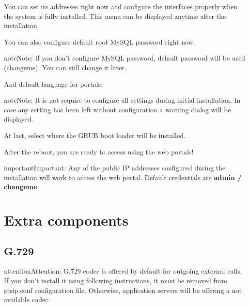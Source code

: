 \documentclass[letterpaper,10pt,english]{sphinxmanual}
\begin{document}
You can set its addresses right now and configure the interfaces properly when
the system is fully installed. This menu can be displayed anytime after the
installation.

\noindent{}

You can also configure default root MySQL password right now.

\begin{notice}{note}{Note:}
If you don't configure MySQL password, default password will be used
(changeme). You can still change it later.
\end{notice}

\noindent{}

And default language for portals:

\noindent{}

\begin{notice}{note}{Note:}
It is not require to configure all settings during initial
installation. In case any setting has been left without configuration a
warning dialog will be displayed.
\end{notice}

\noindent{}

At last, select where the GRUB boot loader will be installed.

\noindent{}

After the reboot, you are ready to access using the web portals!

\begin{notice}{important}{Important:}
Any of the public IP addresses configured during the
installation will work to access the web portal. Default credentials are
\textbf{admin / changeme}.
\end{notice}


\section{Extra components}
\label{basic_concepts/installation/extra_components::doc}\label{basic_concepts/installation/extra_components:extra-components}

\subsection{G.729}
\label{basic_concepts/installation/extra_components:g-729}
\begin{notice}{attention}{Attention:}
G.729 codec is offered by default for outgoing external calls. If you
don't install it using following instructions, it must be removed from pjsip.conf
configuration file. Otherwise, application servers will be offering a not available codec.
\end{notice}
\end{document}
